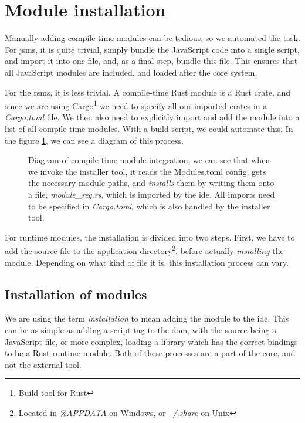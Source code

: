 \section{Module installation}

Manually adding compile-time modules can be tedious, so we automated the task.
For \gls{jsms}, it is quite trivial, simply bundle the JavaScript code into a
single script, and import it into one file, and, as a final step, bundle this
file. This ensures that all JavaScript modules are included, and loaded after
the core system.

For the \gls{rsms}, it is less trivial. A compile-time Rust module is a Rust
crate, and since we are using Cargo\footnote{Build tool for Rust} we need to
specify all our imported crates in a \textit{Cargo.toml} file. We then also
need to explicitly import and add the module into a list of all compile-time
modules. With a build script, we could automate this. In the figure
\ref{fig:compMod}, we can see a diagram of this process.

\begin{figure}
  \centering
  
  \caption{
    Diagram of compile time module integration, we can see that when we invoke
    the installer tool, it reads the Modules.toml config, gets the necessary
    module paths, and \textit{installs} them by writing them onto a file,
    \textit{module\_reg.rs}, which is imported by the \gls*{ide}. All imports
    need to be specified in \textit{Cargo.toml}, which is also handled by the
    installer tool.
  }
  \label{fig:compMod}
\end{figure}

For runtime modules, the installation is divided into two steps. First, we have
to add the source file to the application directory\footnote{Located in \textit{\%APPDATA} on Windows, or \textit{~/.share} on Unix},
before actually \textit{installing} the module. Depending on what kind of file
it is, this installation process can vary.


\subsection{Installation of modules}
We are using the term \textit{installation} to mean adding the module to the
\gls*{ide}. This can be as simple as adding a script tag to the \gls*{dom}, with
the source being a JavaScript file, or more complex, loading a library which has
the correct bindings to be a Rust runtime module. Both of these processes are a
part of the core, and not the external tool.


